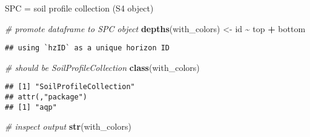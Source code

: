 \documentclass[
]{book}
\newenvironment{Shaded}{\begin{snugshade}}{\end{snugshade}}
\newcommand{\CommentTok}[1]{\textcolor[rgb]{0.56,0.35,0.01}{\textit{#1}}}
\newcommand{\KeywordTok}[1]{\textcolor[rgb]{0.13,0.29,0.53}{\textbf{#1}}}
\newcommand{\NormalTok}[1]{#1}
\newcommand{\OperatorTok}[1]{\textcolor[rgb]{0.81,0.36,0.00}{\textbf{#1}}}
\newcommand{\StringTok}[1]{\textcolor[rgb]{0.31,0.60,0.02}{#1}}
\begin{document}
SPC = soil profile collection (S4 object)

\begin{Shaded}
\begin{Highlighting}[]
\CommentTok{\# promote dataframe to SPC object}
\KeywordTok{depths}\NormalTok{(with\_colors) \textless{}{-}}\StringTok{ }\NormalTok{id }\OperatorTok{\textasciitilde{}}\StringTok{ }\NormalTok{top }\OperatorTok{+}\StringTok{ }\NormalTok{bottom}
\end{Highlighting}
\end{Shaded}

\begin{verbatim}
## using `hzID` as a unique horizon ID
\end{verbatim}

\begin{Shaded}
\begin{Highlighting}[]
\CommentTok{\# should be \textquotesingle{}SoilProfileCollection\textquotesingle{}}
\KeywordTok{class}\NormalTok{(with\_colors)}
\end{Highlighting}
\end{Shaded}

\begin{verbatim}
## [1] "SoilProfileCollection"
## attr(,"package")
## [1] "aqp"
\end{verbatim}

\begin{Shaded}
\begin{Highlighting}[]
\CommentTok{\# inspect output}
\KeywordTok{str}\NormalTok{(with\_colors)}
\end{Highlighting}
\end{Shaded}
\end{document}

